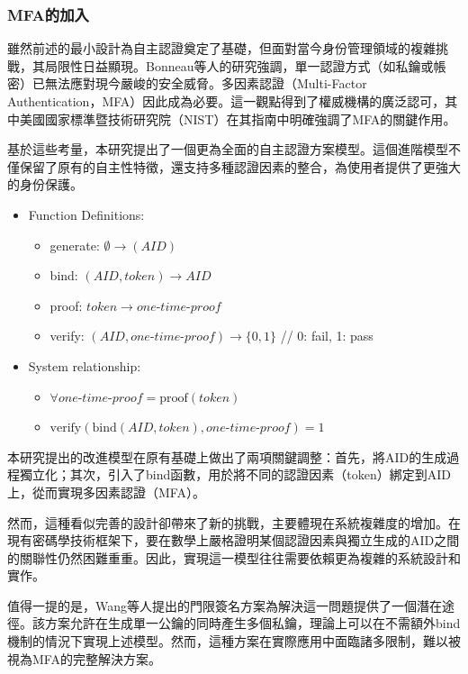 \subsubsection{MFA的加入}
雖然前述的最小設計為自主認證奠定了基礎，但面對當今身份管理領域的複雜挑戰，其局限性日益顯現。Bonneau等人\cite{bonneau2012mfa}的研究強調，單一認證方式（如私鑰或帳密）已無法應對現今嚴峻的安全威脅。多因素認證（Multi-Factor Authentication，MFA）因此成為必要。這一觀點得到了權威機構的廣泛認可，其中美國國家標準暨技術研究院（NIST）在其指南中明確強調了MFA的關鍵作用\cite{NIST800-63-3}。

基於這些考量，本研究提出了一個更為全面的自主認證方案模型。這個進階模型不僅保留了原有的自主性特徵，還支持多種認證因素的整合，為使用者提供了更強大的身份保護。
\begin{itemize}
  \item Function Definitions:
        \begin{itemize}
          \item generate: $\emptyset \rightarrow (AID)$
          \item bind: $(AID, token) \rightarrow AID$
          \item proof: $token \rightarrow one\text{-}time\text{-}proof$
          \item verify: $(AID, one\text{-}time\text{-}proof) \rightarrow \{0,1\}$ \hfill // 0: fail, 1: pass
        \end{itemize}
  \item System relationship:
        \begin{itemize}
          \item $\forall one\text{-}time\text{-}proof = \text{proof}(token)$
          \item $\text{verify}(\text{bind}(AID, token), one\text{-}time\text{-}proof) = 1$
        \end{itemize}
\end{itemize}
本研究提出的改進模型在原有基礎上做出了兩項關鍵調整：首先，將AID的生成過程獨立化；其次，引入了bind函數，用於將不同的認證因素（token）綁定到AID上，從而實現多因素認證（MFA）。

然而，這種看似完善的設計卻帶來了新的挑戰，主要體現在系統複雜度的增加。在現有密碼學技術框架下，要在數學上嚴格證明某個認證因素與獨立生成的AID之間的關聯性仍然困難重重。因此，實現這一模型往往需要依賴更為複雜的系統設計和實作。

值得一提的是，Wang等人\cite{Wang2013ThresholdSignatureSchemes}提出的門限簽名方案為解決這一問題提供了一個潛在途徑。該方案允許在生成單一公鑰的同時產生多個私鑰，理論上可以在不需額外bind機制的情況下實現上述模型。然而，這種方案在實際應用中面臨諸多限制，難以被視為MFA的完整解決方案。

